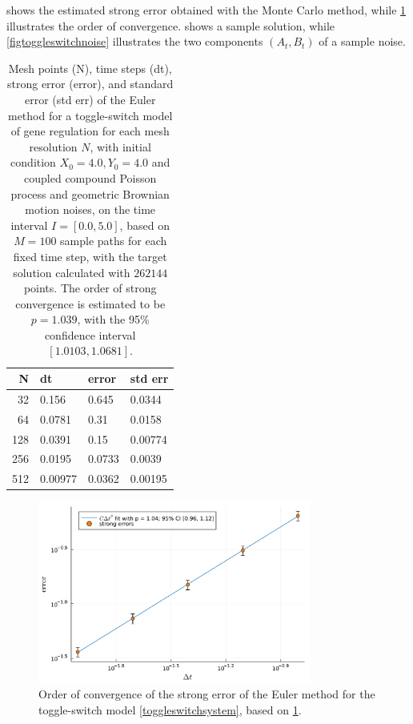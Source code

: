\documentclass[reqno,12pt]{amsart}
\theoremstyle{plain} %
\theoremstyle{definition} %
\begin{document}
 shows the estimated strong error obtained with the Monte Carlo method, while \cref{figtoggleswitch} illustrates the order of convergence.  shows a sample solution, while \cref{figtoggleswitchnoise} illustrates the two components $(A_t, B_t)$ of a sample noise.

\begin{table}
    \begin{center}
        \begin{tabular}[htb]{|r|l|l|l|}
            \hline N & dt & error & std err \\
            \hline \hline
            32 & 0.156 & 0.645 & 0.0344 \\
            64 & 0.0781 & 0.31 & 0.0158 \\
            128 & 0.0391 & 0.15 & 0.00774 \\
            256 & 0.0195 & 0.0733 & 0.0039 \\
            512 & 0.00977 & 0.0362 & 0.00195 \\
            \hline
        \end{tabular}
    \end{center}

    \bigskip

    \caption{Mesh points (N), time steps (dt), strong error (error), and standard error (std err) of the Euler method for a toggle-switch model of gene regulation for each mesh resolution $N$, with initial condition $X_0 = 4.0, Y_0 = 4.0$ and coupled compound Poisson process and geometric Brownian motion noises, on the time interval $I = [0.0, 5.0]$, based on $M = 100$ sample paths for each fixed time step, with the target solution calculated with $262144$ points. The order of strong convergence is estimated to be $p = 1.039$, with the 95\% confidence interval $[1.0103, 1.0681]$.}

    \label{tabletoggleswitch}
\end{table}

\begin{figure}[htb]
    \centerline{\includegraphics[width=0.8\textwidth]{img/order_toggleswitch.pdf}}
    \caption{Order of convergence of the strong error of the Euler method for the toggle-switch model \cref{toggleswitchsystem}, based on \cref{tabletoggleswitch}.}
    \label{figtoggleswitch}
\end{figure}
\end{document}
